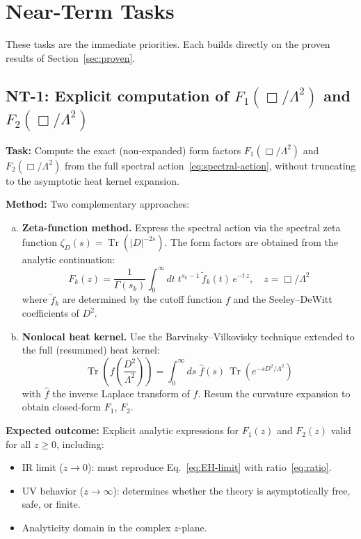 \documentclass[12pt,a4paper]{article}
\newcommand{\Tr}{\operatorname{Tr}}
\newcommand{\Lam}{\Lambda}
\newcommand{\task}[1]{\noindent\textbf{Task:} #1\par}
\newcommand{\method}[1]{\noindent\textbf{Method:} #1\par}
\newcommand{\outcome}[1]{\noindent\textbf{Expected outcome:} #1\par}
\begin{document}
\section{\textcolor{near}{Near-Term Tasks}}
\label{sec:near}

These tasks are the immediate priorities. Each builds directly on the
proven results of Section~\ref{sec:proven}.

\subsection{NT-1: Explicit computation of $F_1(\Box/\Lam^2)$ and $F_2(\Box/\Lam^2)$}
\label{task:NT1}

\task{Compute the exact (non-expanded) form factors $F_1(\Box/\Lam^2)$
and $F_2(\Box/\Lam^2)$ from the full spectral action~\eqref{eq:spectral-action},
without truncating to the asymptotic heat kernel expansion.}

\method{Two complementary approaches:
\begin{enumerate}[(a)]
  \item \textbf{Zeta-function method.} Express the spectral action via the
    spectral zeta function $\zeta_D(s) = \Tr(|D|^{-2s})$. The form factors
    are obtained from the analytic continuation:
    \begin{equation}\label{eq:zeta-method}
      F_k(z) = \frac{1}{\Gamma(s_k)} \int_0^\infty dt\; t^{s_k - 1}\,
      \tilde{f}_k(t)\, e^{-t\,z}, \quad z = \Box/\Lam^2
    \end{equation}
    where $\tilde{f}_k$ are determined by the cutoff function $f$ and the
    Seeley--DeWitt coefficients of $D^2$.

  \item \textbf{Nonlocal heat kernel.} Use the Barvinsky--Vilkovisky technique
    extended to the full (resummed) heat kernel:
    \begin{equation}\label{eq:heat-kernel}
      \Tr\!\left(f\!\left(\frac{D^2}{\Lam^2}\right)\right)
      = \int_0^\infty ds\;\hat{f}(s)\,\Tr\!\left(e^{-s D^2/\Lam^2}\right)
    \end{equation}
    with $\hat{f}$ the inverse Laplace transform of $f$. Resum the curvature
    expansion to obtain closed-form $F_1$, $F_2$.
\end{enumerate}
}

\outcome{Explicit analytic expressions for $F_1(z)$ and $F_2(z)$ valid for
all $z \geq 0$, including:
\begin{itemize}
  \item IR limit ($z \to 0$): must reproduce Eq.~\eqref{eq:EH-limit} with ratio~\eqref{eq:ratio}.
  \item UV behavior ($z \to \infty$): determines whether the theory is asymptotically free,
    safe, or finite.
  \item Analyticity domain in the complex $z$-plane.
\end{itemize}
}
\end{document}
